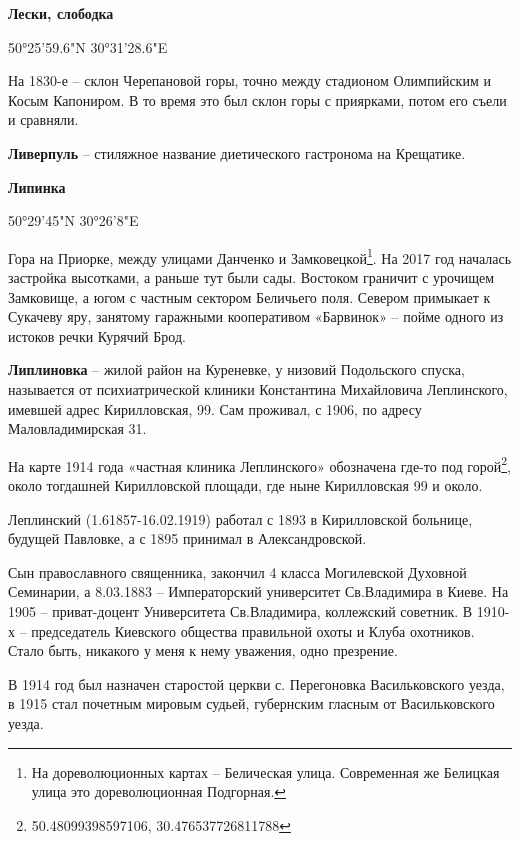 \medskip

\textbf{Лески, слободка}

50°25'59.6"N 30°31'28.6"E

На 1830-е – склон Черепановой горы, точно между стадионом Олимпийским и Косым Капониром. В то время это был склон горы с приярками, потом его съели и сравняли.\\

\medskip


\textbf{Ливерпуль} – стиляжное название диетического гастронома на Крещатике.\\

\medskip


\textbf{Липинка}

50°29'45"N 30°26'8"E

Гора на Приорке, между улицами Данченко и Замковецкой\footnote{На дореволюционных картах – Белическая улица. Современная же Белицкая улица это дореволюционная Подгорная.}. На 2017 год началась застройка высотками, а раньше тут были сады. Востоком граничит с урочищем Замковище, а югом с частным сектором Беличьего поля. Севером примыкает к Сукачеву яру, занятому гаражными кооперативом «Барвинок» – пойме одного из истоков речки Курячий Брод.\\

\medskip


\textbf{Липлиновка} – жилой район на Куреневке, у низовий Подольского спуска, называется от психиатрической клиники Константина Михайловича Леплинского, имевшей адрес Кирилловская, 99. Сам проживал, с 1906, по адресу Маловладимирская 31.

На карте 1914 года «частная клиника Леплинского» обозначена где-то под горой\footnote{50.48099398597106, 30.476537726811788}, около тогдашней Кирилловской площади, где ныне Кирилловская 99 и около.

Леплинский (1.61857-16.02.1919) работал с 1893 в Кирилловской больнице, будущей Павловке, а с 1895 принимал в Александровской.
 
Сын православного священника, закончил 4 класса Могилевской Духовной Семинарии, а 8.03.1883 – Императорский университет Св.Владимира в Киеве. На 1905 – приват-доцент Университета Св.Владимира, коллежский советник. В 1910-х – председатель Киевского общества правильной охоты и Клуба охотников. Стало быть, никакого у меня к нему уважения, одно презрение.

В 1914 год был назначен старостой церкви с. Перегоновка Васильковского уезда, в 1915 стал почетным мировым судьей, губернским гласным от Васильковского уезда.

